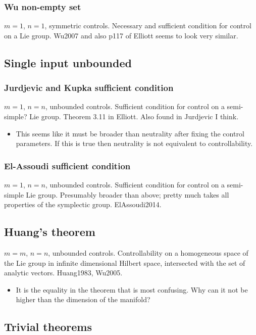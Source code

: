 \subsubsection{Wu non-empty set}
$m=1$, $n=1$, symmetric controls. Necessary and sufficient condition for control on a Lie group. Wu2007 and also p117 of Elliott seems to look very similar.

\subsection{Single input unbounded}
\subsubsection{Jurdjevic and Kupka sufficient condition}
$m=1$, $n=n$, unbounded controls. Sufficient condition for control on a semi-simple? Lie group. Theorem 3.11 in Elliott. Also found in Jurdjevic I think.
\begin{itemize}
 \item This seems like it must be broader than neutrality after fixing the control parameters. If this is true then neutrality is not equivalent to controllability.
\end{itemize}

\subsubsection{El-Assoudi sufficient condition}
$m=1$, $n=n$, unbounded controls. Sufficient condition for control on a semi-simple Lie group. Presumably broader than above; pretty much takes all properties of the symplectic group. ElAssoudi2014. 
\subsection{Huang's theorem}
$m=m$, $n=n$, unbounded controls. Controllability on a homogeneous space of the Lie group in infinite dimensional Hilbert space, intersected with the set of analytic vectors. Huang1983, Wu2005. 
\begin{itemize}
 \item It is the equality in the theorem that is most confusing. Why can it not be higher than the dimension of the manifold?
\end{itemize}

\subsection{Trivial theorems}
